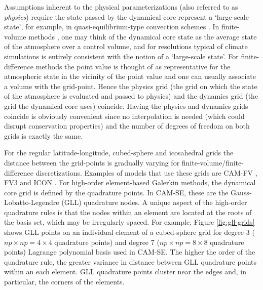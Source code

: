 \documentclass[twocol]{ametsoc}
\begin{document}
Assumptions inherent to the physical parameterizations (also referred to as {\em{physics}}) require the state passed by the dynamical core represent a `large-scale state', for example, in quasi-equilibrium-type convection schemes \citep{AS1974JAS,PC2008JAS}. In finite-volume methods {\color{red}\citep[e.g., ][]{L2004MWR}{}}, one may think of the dynamical core state as the average state of the atmosphere over a control volume, and for resolutions typical of climate simulations is entirely consistent with the notion of a `large-scale state'. For finite-difference methods {\color{red}\citep[e.g., ][]{SETAL983MWR}{}} the point value is thought of as representative for the atmospheric state in the vicinity of the point value and one can usually associate a volume with the grid-point. Hence the physics grid (the grid on which the state of the atmosphere is evaluated and passed to physics) and the dynamics grid (the grid the dynamical core uses) coincide. Having the physics and dynamics grids coincide is obviously convenient since no interpolation is needed (which could disrupt conservation properties) and the number of degrees of freedom on both grids is exactly the same. 

For the regular latitude-longitude, cubed-sphere and icosahedral grids the distance between the grid-points is gradually varying for finite-volume/finite-difference discretizations. {\color{red}Examples of models that use these grids are CAM-FV \citep[latitude-longitude grid, ][]{L2004MWR}, FV3 \citep[cubed-sphere grid, ][]{PL2007JCP} and ICON \citep[icosahedral grid, ][]{WETAL2013GMD}.{}} For high-order element-based Galerkin methods, the dynamical core grid is defined by the quadrature points. In CAM-SE, these are the Gauss-Lobatto-Legendre (GLL) quadrature nodes. A unique aspect of the high-order quadrature rules is that the nodes within an element are located at the roots of the basis set, which may be irregularly spaced. For example, Figure \ref{fig:gll-grids} shows GLL points on an individual element of a cubed-sphere grid for degree 3 {\color{red}($np\times np=4\times 4$ quadrature points){}} and degree 7 {\color{red}($np\times np=8\times 8$ quadrature points){}} Lagrange polynomial basis used in CAM-SE. The higher the order of the quadrature rule, {\color{red}the greater variance in distance between GLL quadrature points within an each element.{}} GLL quadrature points cluster near the edges and, in particular, the corners of the elements.
\end{document}

